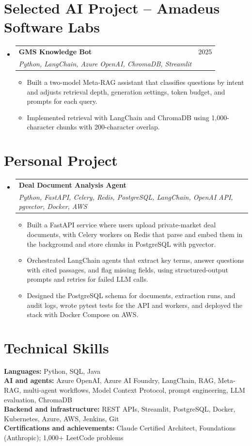 \documentclass[a4paper,11pt]{article}
\makeatletter
\newcommand{\entry}[4]{\item\begin{tabularx}{\textwidth}{@{}Xr@{}}\textbf{#1}& #2\\\textit{\small #3}&\textit{\small #4}\end{tabularx}\vspace{-5pt}}
\newcommand{\bulletpoint}[1]{\item\small{#1}}
\makeatother
\begin{document}
\section{Selected AI Project -- Amadeus Software Labs}
\begin{itemize}[leftmargin=0in,label={}]
  \entry{GMS Knowledge Bot}{2025}{Python, LangChain, Azure OpenAI, ChromaDB, Streamlit}{}
  \begin{itemize}
    \bulletpoint{Built a two-model Meta-RAG assistant that classif{}ies questions by intent and adjusts retrieval depth, generation settings, token budget, and prompts for each query.}
    \bulletpoint{Implemented retrieval with LangChain and ChromaDB using 1,000-character chunks with 200-character overlap.}
  \end{itemize}
\end{itemize}

\section{Personal Project}
\begin{itemize}[leftmargin=0in,label={}]
  \entry{Deal Document Analysis Agent}{}{Python, FastAPI, Celery, Redis, PostgreSQL, LangChain, OpenAI API, pgvector, Docker, AWS}{}
  \begin{itemize}
    \bulletpoint{Built a FastAPI service where users upload private-market deal documents, with Celery workers on Redis that parse and embed them in the background and store chunks in PostgreSQL with pgvector.}
    \bulletpoint{Orchestrated LangChain agents that extract key terms, answer questions with cited passages, and f{}lag missing f{}ields, using structured-output prompts and retries for failed LLM calls.}
    \bulletpoint{Designed the PostgreSQL schema for documents, extraction runs, and audit logs, wrote pytest tests for the API and workers, and deployed the stack with Docker Compose on AWS.}
  \end{itemize}
\end{itemize}

\section{Technical Skills}
\small\textbf{Languages:} Python, SQL, Java \\
\textbf{AI and agents:} Azure OpenAI, Azure AI Foundry, LangChain, RAG, Meta-RAG, multi-agent \mbox{workf{}lows}, Model Context Protocol, prompt engineering, LLM evaluation, ChromaDB \\
\textbf{Backend and infrastructure:} REST APIs, Streamlit, PostgreSQL, Docker, Kubernetes, Azure, AWS, Jenkins, Git \\
\textbf{Certif{}ications and achievements:} Claude \mbox{Certif{}ied} Architect, Foundations (Anthropic); 1,000+ LeetCode problems
\end{document}
